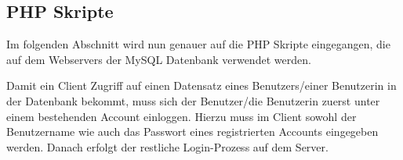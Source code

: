 \documentclass[../main.tex]{subfiles}
\begin{document}
	
	\subsection{PHP Skripte}
	Im folgenden Abschnitt wird nun genauer auf die PHP Skripte eingegangen, die auf dem Webservers der MySQL Datenbank verwendet werden.
	
	Damit ein Client Zugriff auf einen Datensatz eines Benutzers/einer Benutzerin in der Datenbank bekommt, muss sich der Benutzer/die Benutzerin zuerst unter einem bestehenden Account einloggen. Hierzu muss im Client sowohl der Benutzername wie auch das Passwort eines registrierten Accounts eingegeben werden. Danach erfolgt der restliche Login-Prozess auf dem Server.
	 
\end{document}
